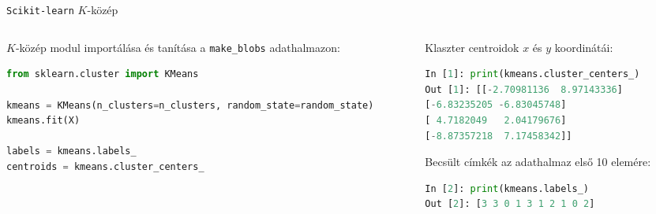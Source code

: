 \documentclass[english, aspectratio=169]{beamer}
\begin{document}
	\begin{frame}[fragile]{\texttt{Scikit-learn} $K$-közép }
		\begin{columns}
			\begin{column}{.5\textwidth}
				$K$-közép modul importálása és tanítása a \texttt{make\_blobs} adathalmazon:
				\begin{lstlisting}[language=python]
from sklearn.cluster import KMeans

kmeans = KMeans(n_clusters=n_clusters, random_state=random_state)
kmeans.fit(X)

labels = kmeans.labels_
centroids = kmeans.cluster_centers_
				\end{lstlisting}
			\end{column}
			\begin{column}{.5\textwidth}
				Klaszter centroidok $x$ és $y$ koordinátái:
				\begin{lstlisting}[language=python]
 In [1]: print(kmeans.cluster_centers_)
Out [1]: [[-2.70981136  8.97143336]
[-6.83235205 -6.83045748]
[ 4.7182049   2.04179676]
[-8.87357218  7.17458342]]
				\end{lstlisting}
				\par\medskip
				Becsült címkék az adathalmaz első 10 elemére:
				\begin{lstlisting}[language=python]
 In [2]: print(kmeans.labels_)
Out [2]: [3 3 0 1 3 1 2 1 0 2]
				\end{lstlisting}
			\end{column}
		\end{columns}
	\end{frame}
	
\end{document}
